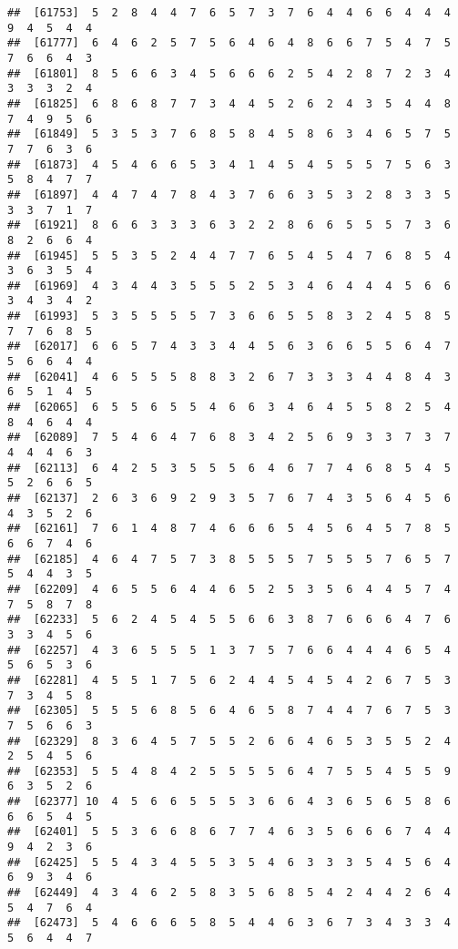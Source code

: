 \documentclass[
]{book}
\begin{document}
\begin{verbatim}
##  [61753]  5  2  8  4  4  7  6  5  7  3  7  6  4  4  6  6  4  4  4  9  4  5  4  4
##  [61777]  6  4  6  2  5  7  5  6  4  6  4  8  6  6  7  5  4  7  5  7  6  6  4  3
##  [61801]  8  5  6  6  3  4  5  6  6  6  2  5  4  2  8  7  2  3  4  3  3  3  2  4
##  [61825]  6  8  6  8  7  7  3  4  4  5  2  6  2  4  3  5  4  4  8  7  4  9  5  6
##  [61849]  5  3  5  3  7  6  8  5  8  4  5  8  6  3  4  6  5  7  5  7  7  6  3  6
##  [61873]  4  5  4  6  6  5  3  4  1  4  5  4  5  5  5  7  5  6  3  5  8  4  7  7
##  [61897]  4  4  7  4  7  8  4  3  7  6  6  3  5  3  2  8  3  3  5  3  3  7  1  7
##  [61921]  8  6  6  3  3  3  6  3  2  2  8  6  6  5  5  5  7  3  6  8  2  6  6  4
##  [61945]  5  5  3  5  2  4  4  7  7  6  5  4  5  4  7  6  8  5  4  3  6  3  5  4
##  [61969]  4  3  4  4  3  5  5  5  2  5  3  4  6  4  4  4  5  6  6  3  4  3  4  2
##  [61993]  5  3  5  5  5  5  7  3  6  6  5  5  8  3  2  4  5  8  5  7  7  6  8  5
##  [62017]  6  6  5  7  4  3  3  4  4  5  6  3  6  6  5  5  6  4  7  5  6  6  4  4
##  [62041]  4  6  5  5  5  8  8  3  2  6  7  3  3  3  4  4  8  4  3  6  5  1  4  5
##  [62065]  6  5  5  6  5  5  4  6  6  3  4  6  4  5  5  8  2  5  4  8  4  6  4  4
##  [62089]  7  5  4  6  4  7  6  8  3  4  2  5  6  9  3  3  7  3  7  4  4  4  6  3
##  [62113]  6  4  2  5  3  5  5  5  6  4  6  7  7  4  6  8  5  4  5  5  2  6  6  5
##  [62137]  2  6  3  6  9  2  9  3  5  7  6  7  4  3  5  6  4  5  6  4  3  5  2  6
##  [62161]  7  6  1  4  8  7  4  6  6  6  5  4  5  6  4  5  7  8  5  6  6  7  4  6
##  [62185]  4  6  4  7  5  7  3  8  5  5  5  7  5  5  5  7  6  5  7  5  4  4  3  5
##  [62209]  4  6  5  5  6  4  4  6  5  2  5  3  5  6  4  4  5  7  4  7  5  8  7  8
##  [62233]  5  6  2  4  5  4  5  5  6  6  3  8  7  6  6  6  4  7  6  3  3  4  5  6
##  [62257]  4  3  6  5  5  5  1  3  7  5  7  6  6  4  4  4  6  5  4  5  6  5  3  6
##  [62281]  4  5  5  1  7  5  6  2  4  4  5  4  5  4  2  6  7  5  3  7  3  4  5  8
##  [62305]  5  5  5  6  8  5  6  4  6  5  8  7  4  4  7  6  7  5  3  7  5  6  6  3
##  [62329]  8  3  6  4  5  7  5  5  2  6  6  4  6  5  3  5  5  2  4  2  5  4  5  6
##  [62353]  5  5  4  8  4  2  5  5  5  5  6  4  7  5  5  4  5  5  9  6  3  5  2  6
##  [62377] 10  4  5  6  6  5  5  5  3  6  6  4  3  6  5  6  5  8  6  6  6  5  4  5
##  [62401]  5  5  3  6  6  8  6  7  7  4  6  3  5  6  6  6  7  4  4  9  4  2  3  6
##  [62425]  5  5  4  3  4  5  5  3  5  4  6  3  3  3  5  4  5  6  4  6  9  3  4  6
##  [62449]  4  3  4  6  2  5  8  3  5  6  8  5  4  2  4  4  2  6  4  5  4  7  6  4
##  [62473]  5  4  6  6  6  5  8  5  4  4  6  3  6  7  3  4  3  3  4  5  6  4  4  7

\end{verbatim}
\end{document}
